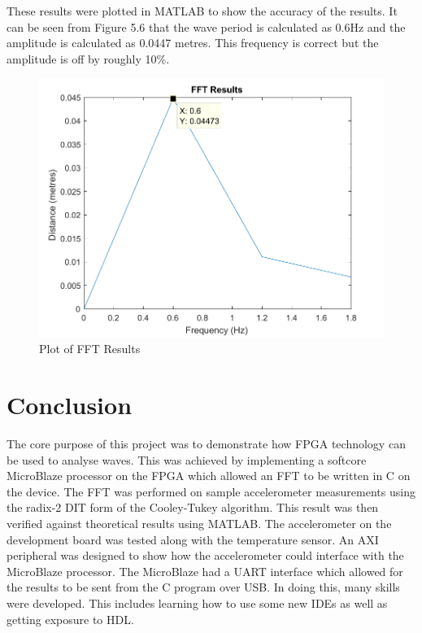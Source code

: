 \documentclass[12pt,a4paper]{report} %
\begin{document}
These results were plotted in MATLAB to show the accuracy of the results.
It can be seen from Figure 5.6 that the wave period is calculated as 0.6Hz and the amplitude is calculated as 0.0447 metres. This frequency  is correct but the amplitude is off by roughly 10\%.
\begin{figure}[ht]
\centerline{\includegraphics[scale=0.5]{diagrams/wave5}}
\caption{Plot of FFT Results}
\end{figure}
\chapter{Conclusion}
The core purpose of this project was to demonstrate how FPGA technology can be used to analyse waves.
This was achieved by implementing a softcore MicroBlaze processor on the FPGA which allowed an FFT to be written in C on the device.
The FFT was performed on sample accelerometer measurements using the radix-2 DIT form of the Cooley-Tukey algorithm.
This result was then verified against theoretical results using MATLAB.
The accelerometer on the development board was tested along with the temperature sensor.
An AXI peripheral was designed to show how the accelerometer could interface with the MicroBlaze processor.
The MicroBlaze had a UART interface which allowed for the results to be sent from the C program over USB.
In doing this, many skills were developed.
This includes learning how to use some new IDEs as well as getting exposure to HDL.
\end{document}
